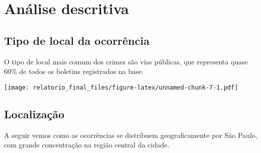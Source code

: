 \documentclass[
  12pt,
  portuguese,
]{report}
\begin{document}
\hypertarget{descritiva}{%
\section{Análise descritiva}\label{descritiva}}

\hypertarget{tipo-de-local-da-ocorruxeancia}{%
\subsection{Tipo de local da ocorrência}\label{tipo-de-local-da-ocorruxeancia}}

O tipo de local mais comum dos crimes são vias públicas, que representa quase 60\% de todos os boletins registrados na base.

\texttt{[image: relatorio\_final\_files/figure-latex/unnamed-chunk-7-1.pdf]}

\hypertarget{localizauxe7uxe3o}{%
\subsection{Localização}\label{localizauxe7uxe3o}}

A seguir vemos como as ocorrências se distribuem geograficamente por São Paulo, com grande concentração na região central da cidade.
\end{document}
